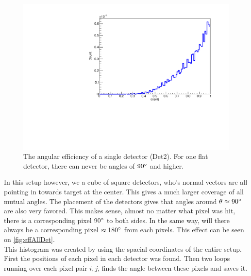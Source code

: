 \begin{figure}[h]
	\includegraphics[width=\linewidth]{../figures/det2Eff.pdf}
	\caption{The angular efficiency of a single detector (Det2). For one flat detector, there can never be angles of $90\degree$ and higher.}
	\label{fig:oneDetEff}
\end{figure}
In this setup however, we a cube of square detectors, who's normal vectors are all pointing in towards target at the center. This gives a much larger coverage of all mutual angles. 
The placement of the detectors gives that angles around $\theta \approx 90 \degree$ are also very favored. This makes sense, almost no matter what pixel was hit, there is a corresponding pixel $90\degree$ to both sides. In the same way, will there always be a corresponding pixel $\approx 180\degree$ from each pixels. This effect can be seen on \cref{fig:effAllDet}. \\
This histogram was created by using the spacial coordinates of the entire setup. First the positions of each pixel in each detector was found. Then two loops running over each pixel pair $i, j$, finds the angle between these pixels and saves it.\\

